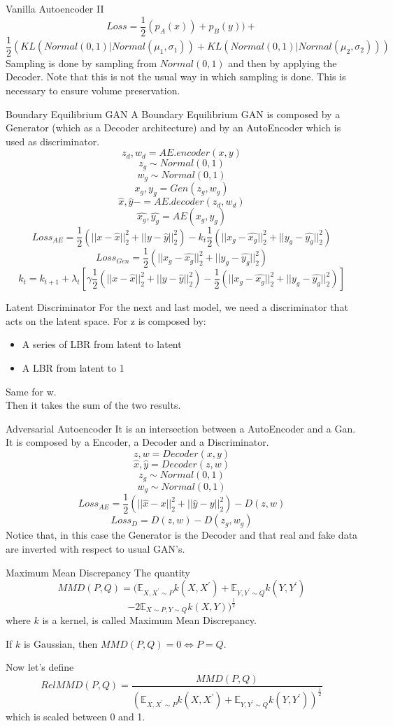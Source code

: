 \documentclass{beamer}
\begin{document}
\begin{frame}{Vanilla Autoencoder II}
$$Loss=\frac{1}{2}(p_{A}(x))+p_{B}(y))+$$ $$\frac{1}{2}(KL(Normal(0,1)|Normal(\mu_{1},\sigma_{1}))+KL(Normal(0,1)|Normal(\mu_{2},\sigma_{2})))$$
Sampling is done by sampling from $Normal(0,1)$  and then by applying the Decoder. Note that this is not the usual way in which sampling is done. This is necessary to ensure volume preservation.
\end{frame}
\begin{frame}{Boundary Equilibrium GAN}
A Boundary Equilibrium GAN is composed by a Generator (which as a Decoder architecture) and by an AutoEncoder which is used as discriminator. 
$$ z_{d},w_{d}=AE.encoder(x,y)$$
$$z_{g}\sim Normal(0,1)$$
$$w_{g}\sim Normal(0,1)$$
$$x_{g},y_{g}=Gen(z_{g},w_{g})$$
$$\hat{x},\hat{y}-=AE.decoder(z_{d},w_{d})$$
$$\hat{x_{g}},\hat{y_{g}}=AE(x_{g},y_{g})$$
$$Loss_{AE}=\frac{1}{2}(||x-\hat{x}||_{2}^{2}+||y-\hat{y}||_{2}^{2})-k_{t}\frac{1}{2}(||x_{g}-\hat{x_{g}}||_{2}^{2}+||y_{g}-\hat{y_{g}}||_{2}^{2})$$
$$Loss_{Gen}=\frac{1}{2}(||x_{g}-\hat{x_{g}}||_{2}^{2}+||y_{g}-\hat{y_{g}}||_{2}^{2})$$
$$k_{t}=k_{t+1}+\lambda_{t}[\gamma\frac{1}{2}(||x-\hat{x}||_{2}^{2}+||y-\hat{y}||_{2}^{2})-\frac{1}{2}(||x_{g}-\hat{x_{g}}||_{2}^{2}+||y_{g}-\hat{y_{g}}||_{2}^{2})]$$
\end{frame}
\begin{frame}{Latent Discriminator}
For the next and last model, we need a discriminator that acts on the latent space. For z is composed by:
\begin{itemize}
\item A series of LBR from latent to latent
\item A LBR from latent to 1 
\end{itemize}
Same for w.\\
Then it takes the sum of the two results.
\end{frame}
\begin{frame}{Adversarial Autoencoder}
It is an intersection between a AutoEncoder and a Gan. It is composed by a Encoder, a Decoder and a Discriminator.
$$z,w=Decoder(x,y)$$
$$\hat{x},\hat{y}=Decoder(z,w)$$
$$z_{g}\sim Normal(0,1)$$
$$w_{g}\sim Normal(0,1)$$
$$Loss_{AE}=\frac{1}{2}(||\hat{x}-x||_{2}^{2}+||\hat{y}-y||_{2}^{2})-D(z,w)$$
$$Loss_{D}=D(z,w)-D(z_{g},w_{g})$$
Notice that, in this case the Generator is the Decoder and that real and fake data are inverted with respect to usual GAN's.
\end{frame}
\begin{frame}{Maximum Mean Discrepancy}
The quantity $$MMD(P, Q)= (\mathbb{E}_{X, X^{\prime} \sim P} k\left(X, X^{\prime}\right)+\mathbb{E}_{Y, Y^{\prime} \sim Q} k\left(Y, Y^{\prime}\right)$$ $$-2 \mathbb{E}_{X \sim P, Y \sim Q} k(X, Y))^{\frac{1}{2}}$$ where $k$ is a kernel, is called Maximum Mean Discrepancy.
\begin{theorem}
If $k$ is Gaussian, then $MMD(P,Q)=0\Leftrightarrow P=Q$.
\end{theorem}
Now let's define $$RelMMD(P,Q)=\frac{MMD(P,Q)}{(\mathbb{E}_{X, X^{\prime} \sim P} k\left(X, X^{\prime}\right)+\mathbb{E}_{Y, Y^{\prime} \sim Q} k\left(Y, Y^{\prime}\right))^{\frac{1}{2}}}$$
which is scaled between 0 and 1.
\end{frame}
\end{document}
